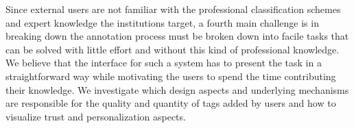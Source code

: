 Since external users are not familiar with the professional classification schemes and expert knowledge the institutions target, a fourth main challenge is in breaking down the annotation process must be broken down into facile tasks that can be solved with little effort and without this kind of professional knowledge. %
We believe that the interface for such a system has to present the task in a straightforward way while motivating the users to spend the time contributing their knowledge. We investigate which design aspects and underlying mechanisms are responsible for the quality and quantity of tags added by users and how to visualize trust and personalization aspects.

